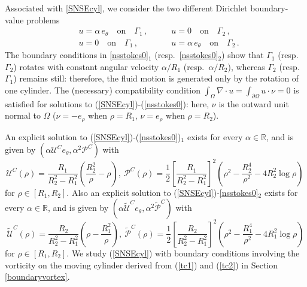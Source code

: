 \documentclass[a4paper,11pt]{amsart}
\numberwithin{equation}{section}
\numberwithin{figure}{section}
\def\U{{\mathcal U}}
\def\P{{\mathcal P}}
\def\eq#1{(\ref{#1})}
\begin{document}
	Associated with \eqref{SNSEcyl}, we consider the two different Dirichlet boundary-value problems
	\begin{equation}\label{nsstokes0}
		\begin{aligned}
			& u=\alpha \, e_\theta\quad \text{on}\quad \Gamma_1\, ,\qquad & u =0\quad \text{on}\quad \Gamma_2\, ,\\
			& u=0\quad \text{on}\quad \Gamma_1\, ,\qquad & u =\alpha \, e_\theta\quad \text{on}\quad \Gamma_2\, .
		\end{aligned}
	\end{equation}
The boundary conditions in \eqref{nsstokes0}$_1$ (resp.\ \eqref{nsstokes0}$_2$) show that $\Gamma_1$ (resp.\ $\Gamma_2$) rotates with
constant angular velocity $\alpha/R_1$ (resp.\ $\alpha/R_2$), whereas $\Gamma_2$ (resp.\ $\Gamma_1$) remains still: therefore, the fluid motion
is generated only by the rotation of one cylinder.
The (necessary) compatibility condition $\int_{\Omega}\nabla\cdot u =\int_{\partial\Omega}u \cdot\nu=0$ is satisfied for
solutions to \eq{SNSEcyl}-\eq{nsstokes0}: here, $\nu$ is the outward unit normal to $\Omega$ ($\nu=-e_\rho$ when $\rho=R_1$, $\nu=e_\rho$ when $\rho=R_2$).\par
An explicit solution to \eq{SNSEcyl}-\eq{nsstokes0}$_1$ exists for every $\alpha\in \mathbb{R}$, and is given by $(\alpha{\U^C}e_\theta,\alpha^2{\P^C})$ with
	\begin{equation} \label{tc1}
		{\U^C}(\rho) =\frac{R_1}{R_2^2 -R_1^2} \left(\frac{R_2^2}{\rho}-\rho\right), \
		\P^C(\rho) =\frac{1}{2}\left[\frac{R_1}{R_2^2-R_1^2}\right]^{2} \left( \rho^{2} - \frac{R_2^4}{\rho^{2}}
		- 4R_2^2 \log\rho \right)\, 
	\end{equation}
	for $\rho\in [R_1,R_2]$. Also an explicit solution to \eq{SNSEcyl}-\eqref{nsstokes0}$_2$ exists for every $\alpha\in \mathbb{R}$, and is given by
	$(\alpha{\widetilde\U^C}e_\theta,\alpha^2{\widetilde\P^C})$ with
	\begin{equation} \label{tc2}
		{\widetilde\U^C}(\rho) =\frac{R_2}{R_2^2 -R_1^2} \left(\rho-\frac{R_1^2}{\rho}\right), \
		\widetilde\P^C(\rho) =\frac{1}{2}\left[\frac{R_2}{R_2^2-R_1^2}\right]^{2} \left(\rho^2-\frac{R_1^4}{\rho^{2}}-4R_1^2\log\rho\right) 
	\end{equation}
    for $\rho\in [R_1,R_2]$. We study \eq{SNSEcyl} with boundary conditions involving the vorticity on the moving cylinder derived from \eq{tc1} and \eq{tc2} in Section \ref{boundaryvortex}.\par
	
\end{document}
